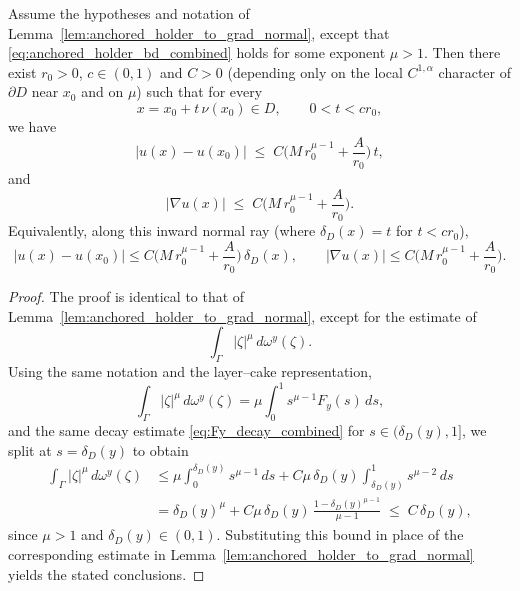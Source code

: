 \documentclass[10pt,a4paper]{amsart}
\begin{document}
\begin{lemma}
\label{lema2}
Assume the hypotheses and notation of Lemma~\ref{lem:anchored_holder_to_grad_normal}, except that
\eqref{eq:anchored_holder_bd_combined} holds for some exponent $\mu>1$.
Then there exist $r_0>0$, $c\in(0,1)$ and $C>0$ (depending only on the local $C^{1,\alpha}$ character
of $\partial D$ near $x_0$ and on $\mu$) such that for every
\[
x=x_0+t\,\nu(x_0)\in D,\qquad 0<t<cr_0,
\]
we have
\begin{equation}\label{eq:holder_mu_gt_1}
|u(x)-u(x_0)|
\;\le\; C\Big(M\,r_0^{\mu-1}+\frac{A}{r_0}\Big)\,t,
\end{equation}
and
\begin{equation}\label{eq:grad_mu_gt_1}
|\nabla u(x)|
\;\le\; C\Big(M\,r_0^{\mu-1}+\frac{A}{r_0}\Big).
\end{equation}
Equivalently, along this inward normal ray (where $\delta_D(x)=t$ for $t<cr_0$),
\[
|u(x)-u(x_0)|
\le C\Big(M\,r_0^{\mu-1}+\frac{A}{r_0}\Big)\,\delta_D(x),
\qquad
|\nabla u(x)|
\le C\Big(M\,r_0^{\mu-1}+\frac{A}{r_0}\Big).
\]
\end{lemma}

\begin{proof}[Proof]
The proof is identical to that of Lemma~\ref{lem:anchored_holder_to_grad_normal}, except for the estimate of
\[
\int_{\Gamma}|\zeta|^\mu\,d\omega^y(\zeta).
\]
Using the same notation and the layer--cake representation,
\[
\int_{\Gamma}|\zeta|^\mu\,d\omega^y(\zeta)=\mu\int_0^1 s^{\mu-1}F_y(s)\,ds,
\]
and the same decay estimate \eqref{eq:Fy_decay_combined} for $s\in(\delta_D(y),1]$,
we split at $s=\delta_D(y)$ to obtain
\begin{align*}
\int_{\Gamma}|\zeta|^\mu\,d\omega^y(\zeta)
&\le \mu\int_0^{\delta_D(y)} s^{\mu-1}\,ds
   + C\mu\,\delta_D(y)\int_{\delta_D(y)}^{1} s^{\mu-2}\,ds \\
&= \delta_D(y)^\mu
   + C\mu\,\delta_D(y)\,\frac{1-\delta_D(y)^{\mu-1}}{\mu-1}
\;\le\; C\,\delta_D(y),
\end{align*}
since $\mu>1$ and $\delta_D(y)\in(0,1)$. Substituting this bound in place of the corresponding estimate
in Lemma~\ref{lem:anchored_holder_to_grad_normal} yields the stated conclusions.
\end{proof}
\end{document}
